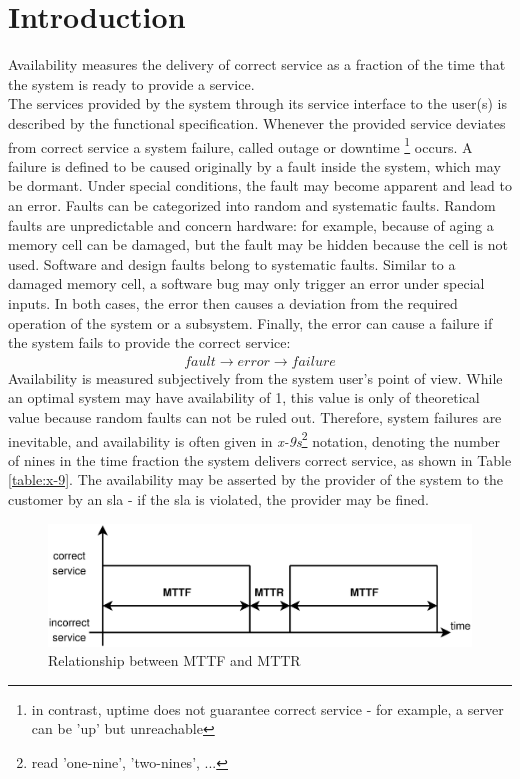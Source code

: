 \section{Introduction}\label{sec:availability}

Availability measures the delivery of correct service as a fraction of the time that the system is ready to provide a service. 
\\
The services provided by the system through its service interface to the user(s) 
is described by the functional specification. Whenever the provided service
deviates from correct service a system failure, called outage or downtime \footnote{in contrast, uptime does not guarantee correct
service - for example, a server can be 'up' but unreachable} occurs. A failure is defined to be caused originally by a fault inside the system, which may be 
dormant. Under special conditions, the fault may become apparent and lead to an error. Faults can be categorized into random and systematic faults.
Random faults are unpredictable and concern hardware: for example, because of aging a memory cell can be damaged, but the fault may be hidden because the cell
is not used. Software and design faults belong to systematic faults. Similar to a damaged memory cell, a software bug may only 
trigger an error under special inputs. In both cases, the error then causes a deviation from the required operation of the system or a subsystem. Finally, the 
error can cause a failure if the system fails to provide the correct service:
\begin{align*}
 fault \rightarrow error \rightarrow failure
\end{align*}
Availability is measured subjectively from the system user's point of view.
While an optimal system may have availability of 1, this value is only of theoretical value because random faults can not be ruled out. Therefore,
system failures are inevitable, and availability is often given in \textit{x-9s}\footnote{read 'one-nine', 'two-nines', ...} notation, denoting the 
number of nines in the time fraction the system delivers correct service, as shown in Table \ref{table:x-9}.
The availability may be asserted by the provider of the system to the customer by an
\gls{sla} - if the \gls{sla} is violated, the provider may be fined.
\begin{figure}
    \centering
    \includegraphics[width=1\textwidth]{figures/availability.eps}
    \caption{Relationship between MTTF and MTTR}
    \label{fig:relmttfmttr}
\end{figure}

